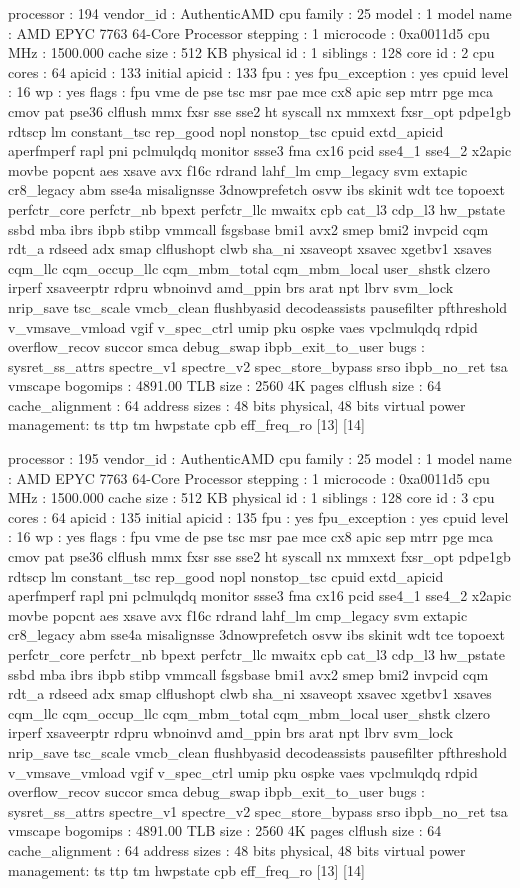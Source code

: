 processor	: 194
vendor_id	: AuthenticAMD
cpu family	: 25
model		: 1
model name	: AMD EPYC 7763 64-Core Processor
stepping	: 1
microcode	: 0xa0011d5
cpu MHz		: 1500.000
cache size	: 512 KB
physical id	: 1
siblings	: 128
core id		: 2
cpu cores	: 64
apicid		: 133
initial apicid	: 133
fpu		: yes
fpu_exception	: yes
cpuid level	: 16
wp		: yes
flags		: fpu vme de pse tsc msr pae mce cx8 apic sep mtrr pge mca cmov pat pse36 clflush mmx fxsr sse sse2 ht syscall nx mmxext fxsr_opt pdpe1gb rdtscp lm constant_tsc rep_good nopl nonstop_tsc cpuid extd_apicid aperfmperf rapl pni pclmulqdq monitor ssse3 fma cx16 pcid sse4_1 sse4_2 x2apic movbe popcnt aes xsave avx f16c rdrand lahf_lm cmp_legacy svm extapic cr8_legacy abm sse4a misalignsse 3dnowprefetch osvw ibs skinit wdt tce topoext perfctr_core perfctr_nb bpext perfctr_llc mwaitx cpb cat_l3 cdp_l3 hw_pstate ssbd mba ibrs ibpb stibp vmmcall fsgsbase bmi1 avx2 smep bmi2 invpcid cqm rdt_a rdseed adx smap clflushopt clwb sha_ni xsaveopt xsavec xgetbv1 xsaves cqm_llc cqm_occup_llc cqm_mbm_total cqm_mbm_local user_shstk clzero irperf xsaveerptr rdpru wbnoinvd amd_ppin brs arat npt lbrv svm_lock nrip_save tsc_scale vmcb_clean flushbyasid decodeassists pausefilter pfthreshold v_vmsave_vmload vgif v_spec_ctrl umip pku ospke vaes vpclmulqdq rdpid overflow_recov succor smca debug_swap ibpb_exit_to_user
bugs		: sysret_ss_attrs spectre_v1 spectre_v2 spec_store_bypass srso ibpb_no_ret tsa vmscape
bogomips	: 4891.00
TLB size	: 2560 4K pages
clflush size	: 64
cache_alignment	: 64
address sizes	: 48 bits physical, 48 bits virtual
power management: ts ttp tm hwpstate cpb eff_freq_ro [13] [14]

processor	: 195
vendor_id	: AuthenticAMD
cpu family	: 25
model		: 1
model name	: AMD EPYC 7763 64-Core Processor
stepping	: 1
microcode	: 0xa0011d5
cpu MHz		: 1500.000
cache size	: 512 KB
physical id	: 1
siblings	: 128
core id		: 3
cpu cores	: 64
apicid		: 135
initial apicid	: 135
fpu		: yes
fpu_exception	: yes
cpuid level	: 16
wp		: yes
flags		: fpu vme de pse tsc msr pae mce cx8 apic sep mtrr pge mca cmov pat pse36 clflush mmx fxsr sse sse2 ht syscall nx mmxext fxsr_opt pdpe1gb rdtscp lm constant_tsc rep_good nopl nonstop_tsc cpuid extd_apicid aperfmperf rapl pni pclmulqdq monitor ssse3 fma cx16 pcid sse4_1 sse4_2 x2apic movbe popcnt aes xsave avx f16c rdrand lahf_lm cmp_legacy svm extapic cr8_legacy abm sse4a misalignsse 3dnowprefetch osvw ibs skinit wdt tce topoext perfctr_core perfctr_nb bpext perfctr_llc mwaitx cpb cat_l3 cdp_l3 hw_pstate ssbd mba ibrs ibpb stibp vmmcall fsgsbase bmi1 avx2 smep bmi2 invpcid cqm rdt_a rdseed adx smap clflushopt clwb sha_ni xsaveopt xsavec xgetbv1 xsaves cqm_llc cqm_occup_llc cqm_mbm_total cqm_mbm_local user_shstk clzero irperf xsaveerptr rdpru wbnoinvd amd_ppin brs arat npt lbrv svm_lock nrip_save tsc_scale vmcb_clean flushbyasid decodeassists pausefilter pfthreshold v_vmsave_vmload vgif v_spec_ctrl umip pku ospke vaes vpclmulqdq rdpid overflow_recov succor smca debug_swap ibpb_exit_to_user
bugs		: sysret_ss_attrs spectre_v1 spectre_v2 spec_store_bypass srso ibpb_no_ret tsa vmscape
bogomips	: 4891.00
TLB size	: 2560 4K pages
clflush size	: 64
cache_alignment	: 64
address sizes	: 48 bits physical, 48 bits virtual
power management: ts ttp tm hwpstate cpb eff_freq_ro [13] [14]

